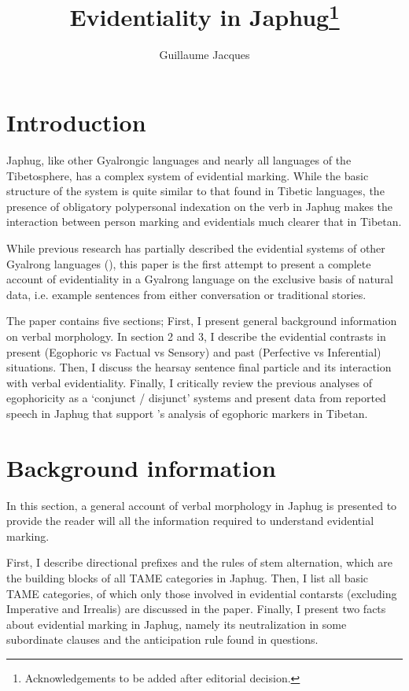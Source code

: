\documentclass[oldfontcommands,oneside,a4paper,11pt]{article}
\begin{document}
 
\title{Evidentiality in Japhug\footnote{ Acknowledgements to be added after editorial decision.
} }
\author{Guillaume Jacques}
\maketitle
\linenumbers

\section{Introduction}
Japhug, like other Gyalrongic languages and nearly all languages of the Tibetosphere, has a complex system of evidential marking. While the basic structure of the system is quite similar to that found in Tibetic languages, the presence of obligatory polypersonal indexation on the verb in Japhug makes the interaction between person marking and evidentials much clearer that in Tibetan.

While previous research has partially described the evidential systems of other Gyalrong languages (\citealt{linyj03tense}), this paper is the first attempt to present a complete account of evidentiality in a Gyalrong language on the exclusive basis of natural data, i.e. example sentences from either conversation or traditional stories.

The paper contains five sections; First, I present general background information on verbal morphology. In section 2 and 3, I describe the evidential contrasts in present (Egophoric vs Factual vs Sensory) and past (Perfective vs Inferential) situations. Then, I discuss the hearsay sentence final particle and its interaction with verbal evidentiality. Finally, I critically review the previous analyses of egophoricity as  a `conjunct / disjunct' systems and present data from reported speech in Japhug that support \citet{tournadre08conjunct}'s analysis of egophoric markers in Tibetan.


\section{Background information}
In this section, a general account of verbal morphology in Japhug is presented to provide the reader will all the information required to understand evidential marking.

First, I describe directional prefixes and the rules of stem alternation, which are the building blocks of all TAME categories in Japhug. Then, I list all basic TAME categories, of which only those involved in evidential contarsts (excluding Imperative and Irrealis) are discussed in the paper. Finally, I present two facts about evidential marking in Japhug, namely its neutralization in some subordinate clauses and the anticipation rule found in questions.
\end{document}

